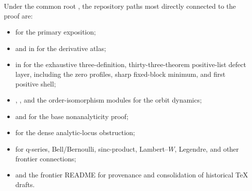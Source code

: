 \documentclass[11pt,oneside]{article}
\theoremstyle{definition}
\theoremstyle{remark}
\begin{document}
Under the common root , the repository paths most
directly connected to the proof are:
\begin{itemize}[leftmargin=2em]
 \item {}
 for the primary exposition;
 \item {}
 and  in  for the derivative atlas;
 \item {} in  for the
 exhaustive three-definition, thirty-three-theorem positive-list defect layer,
 including the zero profiles, sharp fixed-block minimum, and first positive shell;
 \item {}, , and the order-isomorphism
 modules for the orbit dynamics;
 \item {} and  for the
 base nonanalyticity proof;
 \item {} for the dense
 analytic-locus obstruction;
 \item {} for q-series, Bell/Bernoulli,
 sinc-product, Lambert--$W$, Legendre, and other frontier connections;
 \item {} and the frontier README for provenance and consolidation
 of historical TeX drafts.
\end{itemize}
\end{document}
